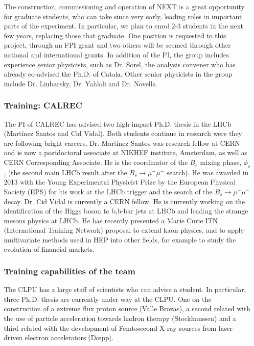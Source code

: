 The construction, commissioning and operation of NEXT is a great opportunity for graduate students, who can take since very early, leading roles in important parts of the experiment. In particular, we plan to enrol 2-3 students in the next few years, replacing those that graduate. One position is requested to this project, through an FPI grant and two others will be seemed through other national and international grants. In addition of the PI, the group includes experience senior physicists, such as Dr. Sorel, the analysis convener who has already co-advised the Ph.D. of Catala. Other senior physicists in the group include Dr. Liubarsky, Dr. Yahlali and Dr. Novella. 

\subsubsection*{Training: CALREC}

The PI of CALREC has advised two high-impact Ph.D. thesis in the LHCb (Martínez Santos
and Cid Vidal). Both students continue in research were they are following bright careers.   
Dr. Mart\'inez Santos was research fellow at CERN and is now a postdoctoral associate at NIKHEF institute, Amsterdam, as well as CERN Corresponding Associate. He is the coordinator of the $B_s$ mixing phase, $\phi_s$, (the second main LHCb result after the $B_s \to \mu^+\mu^-$ search). He was awarded in 2013 with the Young Experimental Physicist Prize by the European Physical Society (EPS) for his work at the LHCb trigger and the search of the $B_s \to \mu^+ \mu^-$ decay. Dr. Cid Vidal is currently a CERN fellow. He is currently working on the identification of the Higgs boson to b,b-bar jets at LHCb and leading the strange mesons physics at LHCb. He has recently presented a Marie Curie ITN  (International Training Network) proposal to extend kaon physics, and to apply multivariate methods used in HEP into other fields, for example to study the evolution of financial markets.
 
 \subsubsection*{Training capabilities of the team}
The CLPU has a large staff of scientists who can advise a student. In particular, three
Ph.D. thesis are currently under way at the CLPU. One on the construction of a extreme flux proton source (Valle Brozas), a second related with the use of particle acceleration towards hadron therapy (Stockhaussen) and a third related with the development of Femtosecond X-ray sources from laser-driven electron accelerators (D{\oe}pp). 


